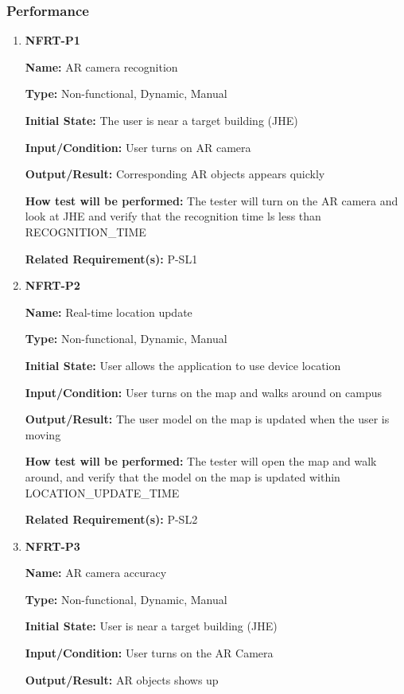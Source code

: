 \documentclass[12pt, titlepage]{article}
\begin{document}
\subsubsection{Performance}

\begin{enumerate}
\item{\textbf{NFRT-P1}}

\textbf{Name:} AR camera recognition

\textbf{Type:} Non-functional, Dynamic, Manual
					
\textbf{Initial State:} The user is near a target building (JHE)
					
\textbf{Input/Condition:} User turns on AR camera
					
\textbf{Output/Result:} Corresponding AR objects appears quickly

\textbf{How test will be performed:} The tester will turn on the AR camera and look at JHE and verify that the recognition time ls less than RECOGNITION\_TIME

\textbf{Related Requirement(s):} P-SL1

\item{\textbf{NFRT-P2}}

\textbf{Name:} Real-time location update

\textbf{Type:} Non-functional, Dynamic, Manual
					
\textbf{Initial State:} User allows the application to use device location
					
\textbf{Input/Condition:} User turns on the map and walks around on campus
					
\textbf{Output/Result:} The user model on the map is updated when the user is moving

\textbf{How test will be performed:} The tester will open the map and walk around, and verify that the model on the map is updated within LOCATION\_UPDATE\_TIME

\textbf{Related Requirement(s):} P-SL2

\item{\textbf{NFRT-P3}}

\textbf{Name:} AR camera accuracy

\textbf{Type:} Non-functional, Dynamic, Manual
					
\textbf{Initial State:} User is near a target building (JHE)
					
\textbf{Input/Condition:} User turns on the AR Camera
					
\textbf{Output/Result:} AR objects shows up


\end{enumerate}
\end{document}
